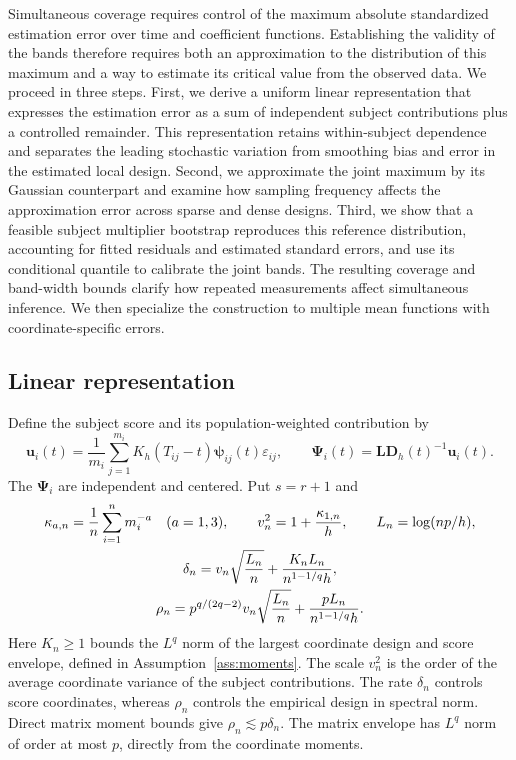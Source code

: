 \documentclass[12pt]{article}
\newcommand{\bu}{{\mathbf u}}
\newcommand{\bD}{{\mathbf D}}
\newcommand{\bL}{{\mathbf L}}
\newcommand{\bpsi} {\boldsymbol{{\mathbf \psi}}}
\newcommand{\bPsi} {\boldsymbol{\Psi}}
\numberwithin{equation}{section}
\begin{document}
Simultaneous coverage requires control of the maximum absolute standardized
estimation error over time and coefficient functions. Establishing the
validity of the bands therefore requires both an approximation to the
distribution of this maximum and a way to estimate its critical value
from the observed data. We proceed in three steps. First, we derive a
uniform linear representation that expresses the estimation error as a
sum of independent subject contributions plus a controlled remainder.
This representation retains within-subject dependence and separates the
leading stochastic variation from smoothing bias and error in the
estimated local design. Second, we approximate the joint maximum by its
Gaussian counterpart and examine how sampling frequency affects the
approximation error across sparse and dense designs. Third, we show
that a feasible subject multiplier bootstrap reproduces this reference
distribution, accounting for fitted residuals and estimated standard
errors, and use its conditional quantile to calibrate the joint bands.
The resulting coverage and band-width bounds clarify how repeated
measurements affect simultaneous inference. We then specialize the
construction to multiple mean functions with coordinate-specific errors.

\subsection{Linear representation}\label{sec:theory-linear}

Define the subject score and its population-weighted contribution by
\begin{equation*}
\bu_i(t)=\frac1{m_i}\sum_{j=1}^{m_i}
K_h(T_{ij}-t)\bpsi_{ij}(t)\varepsilon_{ij},
\qquad \bPsi_i(t)=\bL\bD_h(t)^{-1}\bu_i(t).
\end{equation*}
The $\bPsi_i$ are independent and centered. Put $s=r+1$ and
\begin{gather}
\kappa_{a,n}=\frac1n\sum_{i=1}^n m_i^{-a}\quad(a=1,3),\qquad
v_n^2=1+\frac{\kappa_{1,n}}h,\qquad L_n=\log(np/h),\notag\\
\delta_n=v_n\sqrt{\frac{L_n}{n}}+
\frac{K_n L_n}{n^{1-1/q}h},\notag\\
\rho_n=p^{q/(2q-2)}v_n\sqrt{\frac{L_n}{n}}
+\frac{pL_n}{n^{1-1/q}h}.
\label{eq:basic-rates}
\end{gather}
Here $K_n\ge1$ bounds the $L^q$ norm of the largest coordinate design and
score envelope, defined in Assumption~\ref{ass:moments}.
The scale $v_n^2$ is the order of the average coordinate variance of the
subject contributions. The rate $\delta_n$ controls score coordinates,
whereas $\rho_n$ controls the empirical design in spectral norm.
Direct matrix moment bounds give $\rho_n\lesssim p\delta_n$.
The matrix envelope has $L^q$ norm of order at most $p$, directly
from the coordinate moments.
\end{document}
